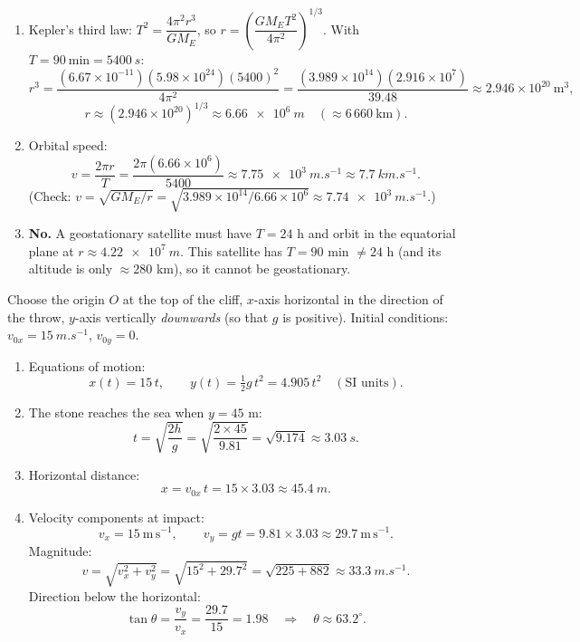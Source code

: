 \documentclass[11pt]{article}
\begin{document}
\begin{corrige}
\begin{enumerate}
\item Kepler's third law: $T^2 = \dfrac{4\pi^2 r^3}{GM_E}$, so $r = \left(\dfrac{GM_E T^2}{4\pi^2}\right)^{1/3}$. With $T = 90\ \mathrm{min} = \SI{5400}{s}$:
\[
r^3 = \frac{(6.67\times10^{-11})(5.98\times10^{24})(5400)^2}{4\pi^2}
= \frac{(3.989\times10^{14})(2.916\times10^{7})}{39.48}
\approx 2.946\times10^{20}\ \mathrm{m^3},
\]
\[
r \approx (2.946\times10^{20})^{1/3} \approx \SI{6.66e6}{m} \quad (\approx 6\,660\ \mathrm{km}).
\]
\item Orbital speed:
\[
v = \frac{2\pi r}{T} = \frac{2\pi(6.66\times10^{6})}{5400} \approx \SI{7.75e3}{m.s^{-1}} \approx \SI{7.7}{km.s^{-1}}.
\]
(Check: $v = \sqrt{GM_E/r} = \sqrt{3.989\times10^{14}/6.66\times10^{6}} \approx \SI{7.74e3}{m.s^{-1}}$.)
\item \textbf{No.} A geostationary satellite must have $T = 24$ h and orbit in the equatorial plane at $r \approx \SI{4.22e7}{m}$. This satellite has $T = 90$ min $\neq 24$ h (and its altitude is only $\approx 280$ km), so it cannot be geostationary.
\end{enumerate}
\end{corrige}

\begin{corrige}
Choose the origin $O$ at the top of the cliff, $x$-axis horizontal in the direction of the throw, $y$-axis vertically \emph{downwards} (so that $g$ is positive). Initial conditions: $v_{0x} = \SI{15}{m.s^{-1}}$, $v_{0y} = 0$.
\begin{enumerate}
\item Equations of motion:
\[
x(t) = 15\,t, \qquad y(t) = \tfrac{1}{2}g\,t^2 = 4.905\,t^2 \quad (\text{SI units}).
\]
\item The stone reaches the sea when $y = 45$ m:
\[
t = \sqrt{\frac{2h}{g}} = \sqrt{\frac{2\times 45}{9.81}} = \sqrt{9.174} \approx \SI{3.03}{s}.
\]
\item Horizontal distance:
\[
x = v_{0x}\,t = 15 \times 3.03 \approx \SI{45.4}{m}.
\]
\item Velocity components at impact:
\[
v_x = 15\ \mathrm{m\,s^{-1}}, \qquad v_y = gt = 9.81 \times 3.03 \approx 29.7\ \mathrm{m\,s^{-1}}.
\]
Magnitude:
\[
v = \sqrt{v_x^2 + v_y^2} = \sqrt{15^2 + 29.7^2} = \sqrt{225 + 882} \approx \SI{33.3}{m.s^{-1}}.
\]
Direction below the horizontal:
\[
\tan\theta = \frac{v_y}{v_x} = \frac{29.7}{15} = 1.98 \quad\Longrightarrow\quad \theta \approx 63.2^{\circ}.
\]
\end{enumerate}
\end{corrige}
\end{document}
